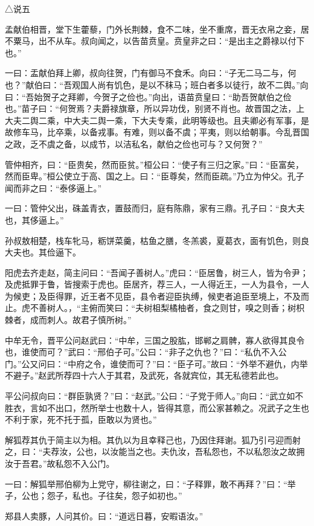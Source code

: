\documentclass[]{article}
\begin{document}
△说五

孟献伯相晋，堂下生藿藜，门外长荆棘，食不二味，坐不重席，晋无衣帛之妾，居不粟马，出不从车。叔向闻之，以告苗贲皇。贲皇非之曰：``是出主之爵禄以付下也。''

一曰：盂献伯拜上卿，叔向往贺，门有御马不食禾。向曰：``子无二马二与，何也？''献伯曰：``吾观国人尚有饥色，是以不秣马；班白者多以徒行，故不二舆。''向曰：``吾始贺子之拜卿，今贺子之俭也。''向出，语苗贲皇曰：``助吾贺献伯之俭也。''苗子曰：``何贺焉？夫爵禄旗章，所以异功伐，别贤不肖也。故晋国之法，上大夫二舆二乘，中大夫二舆一乘，下大夫专乘，此明等级也。且夫卿必有军事，是故修车马，比卒乘，以备戎事。有难，则以备不虞；平夷，则以给朝事。今乱晋国之政，乏不虞之备，以成节，以洁私名，献伯之俭也可与？又何贺？''

管仲相齐，曰：``臣贵矣，然而臣贫。''桓公曰：``使子有三归之家。''曰：``臣富矣，然而臣卑。''桓公使立于高、国之上。曰：``臣尊矣，然而臣疏。''乃立为仲父。孔子闻而非之曰：``泰侈逼上。''

一曰：管仲父出，硃盖青衣，置鼓而归，庭有陈鼎，家有三鼎。孔子曰：``良大夫也，其侈逼上。''

孙叔敖相楚，栈车牝马，粝饼菜羹，枯鱼之膳，冬羔裘，夏葛衣，面有饥色，则良大夫也。其俭逼下。

阳虎去齐走赵，简主问曰：``吾闻子善树人。''虎曰：``臣居鲁，树三人，皆为令尹；及虎抵罪于鲁，皆搜索于虎也。臣居齐，荐三人，一人得近王，一人为县令，一人为候吏；及臣得罪，近王者不见臣，县令者迎臣执缚，候吏者追臣至境上，不及而止。虎不善树人。，``主俯而笑曰：``夫树柤梨橘柚者，食之则甘，嗅之则香；树枳棘者，成而刺人。故君子慎所树。''

中牟无令，晋平公问赵武曰：``中牟，三国之股肱，邯郸之肩髀，寡人欲得其良令也，谁使而可？''武曰：``邢伯子可。''公曰：``非子之仇也？''曰：``私仇不入公门。''公又问曰：``中府之令，谁使而可？''曰：``臣子可。''故曰：``外举不避仇，内举不避子。''赵武所荐四十六人于其君，及武死，各就宾位，其无私德若此也。

平公问叔向曰：``群臣孰贤？''曰：``赵武。''公曰：``子党于师人。''向曰：``武立如不胜衣，言如不出口，然所举士也数十人，皆得其意，而公家甚赖之。况武子之生也不利于家，死不托于孤，臣敢以为贤也。''

解狐荐其仇于简主以为相。其仇以为且幸释己也，乃因住拜谢。狐乃引弓迎而射之，曰：``夫荐汝，公也，以汝能当之也。夫仇汝，吾私怨也，不以私怨汝之故拥汝于吾君。''故私怨不入公门。

一曰：解狐举邢伯柳为上党守，柳往谢之，曰：``子释罪，敢不再拜？''曰：``举子，公也；怨子，私也。子往矣，怨子如初也。''

郑县人卖豚，人问其价。曰：``道远日暮，安暇语汝。''
\end{document}
